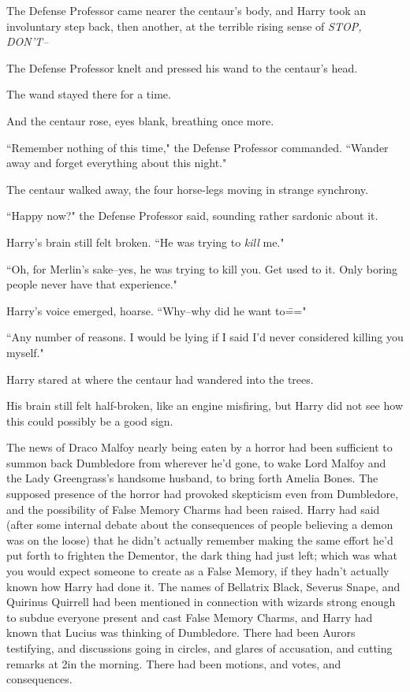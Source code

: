 The Defense Professor came nearer the centaur's body, and Harry took an involuntary step back, then another, at the terrible rising sense of \emph{STOP, DON'T\---}

The Defense Professor knelt and pressed his wand to the centaur's head.

The wand stayed there for a time.

And the centaur rose, eyes blank, breathing once more.

``Remember nothing of this time," the Defense Professor commanded. ``Wander away and forget everything about this night."

The centaur walked away, the four horse-legs moving in strange synchrony.

``Happy now?" the Defense Professor said, sounding rather sardonic about it.

Harry's brain still felt broken. ``He was trying to \emph{kill} me."

``Oh, for Merlin's sake\---yes, he was trying to kill you. Get used to it. Only boring people never have that experience."

Harry's voice emerged, hoarse. ``Why\---why did he want to\==="

``Any number of reasons. I would be lying if I said I'd never considered killing you myself."

Harry stared at where the centaur had wandered into the trees.

His brain still felt half-broken, like an engine misfiring, but Harry did not see how this could possibly be a good sign.

\later

The news of Draco Malfoy nearly being eaten by a horror had been sufficient to summon back Dumbledore from wherever he'd gone, to wake Lord Malfoy and the Lady Greengrass's handsome husband, to bring forth Amelia Bones. The supposed presence of the horror had provoked skepticism even from Dumbledore, and the possibility of False Memory Charms had been raised. Harry had said (after some internal debate about the consequences of people believing a demon was on the loose) that he didn't actually remember making the same effort he'd put forth to frighten the Dementor, the dark thing had just left; which was what you would expect someone to create as a False Memory, if they hadn't actually known how Harry had done it. The names of Bellatrix Black, Severus Snape, and Quirinus Quirrell had been mentioned in connection with wizards strong enough to subdue everyone present and cast False Memory Charms, and Harry had known that Lucius was thinking of Dumbledore. There had been Aurors testifying, and discussions going in circles, and glares of accusation, and cutting remarks at 2\am in the morning. There had been motions, and votes, and consequences.


